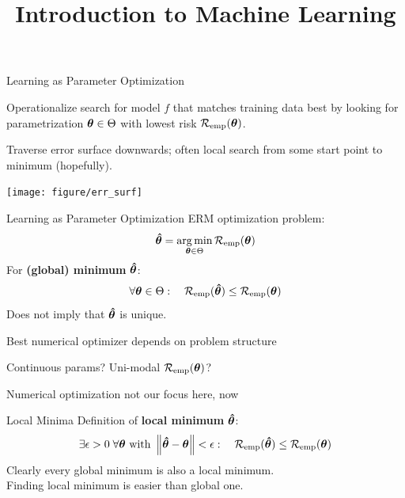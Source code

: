 \documentclass[11pt,compress,t,notes=noshow, xcolor=table]{beamer}
\title{Introduction to Machine Learning}
\begin{document}


\begin{framei}{Learning as Parameter Optimization}
\item Operationalize search for model $f$ that matches training data best by looking for parametrization $\bm{\theta} \in \Theta$ with lowest risk $\mathcal{R}_{\text{emp}}(\bm{\theta})$.
\item Traverse error surface downwards; often local search from some start point to minimum (hopefully).
\vfill
\begin{center}
\texttt{[image: figure/err\_surf]}
\end{center}
\end{framei}


\begin{frame2}{Learning as Parameter Optimization}
ERM optimization problem:
$$
\bm{\hat\theta} = \mathop{\mathrm{arg\,min}}_{\bm{\theta} \in \Theta} \mathcal{R}_{\text{emp}}(\bm{\theta}) 
$$
For \textbf{(global) minimum} $\bm{\hat\theta}$:
$$
\forall \bm{\theta} \in \Theta :\quad \mathcal{R}_{\text{emp}}(\bm{\hat\theta}) \leq \mathcal{R}_{\text{emp}}(\bm{\theta}) 
$$
Does not imply that $\bm{\hat\theta}$ is unique. \\
\vfill
\begin{itemizeM}
  \item Best numerical optimizer depends on problem structure
  \item Continuous params? Uni-modal $\mathcal{R}_{\text{emp}}(\bm{\theta})$? 
  \item Numerical optimization not our focus here, now
\end{itemizeM}
\end{frame2}


\begin{frame2}{Local Minima}
Definition of \textbf{local minimum} $\bm{\hat\theta}$:
$$
\exists \epsilon > 0\; \forall \bm{\theta} \text{ with } \left\Vert\bm{\hat\theta} - \bm{\theta}\right\Vert < \epsilon: \quad \mathcal{R}_{\text{emp}}(\bm{\hat\theta}) \leq \mathcal{R}_{\text{emp}}(\bm{\theta}) 
$$
Clearly every global minimum is also a local minimum.\\
Finding local minimum is easier than global one.
\vfill
{}
\end{frame2}
\end{document}
